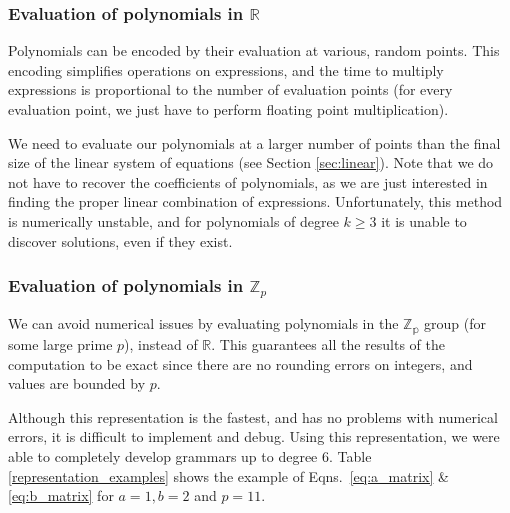\subsubsection{Evaluation of polynomials in $\mathbb{R}$}
Polynomials can be encoded by their evaluation at various, random points.
This encoding simplifies operations on expressions, and the time to multiply expressions
is proportional to the number of evaluation points (for every evaluation
point, we just have to perform floating point multiplication).

We need to evaluate our polynomials at a larger number of points than
the final size of the linear system of equations (see Section
\ref{sec:linear}). Note that we do not have to recover the
coefficients of polynomials, as we are just interested in finding the
proper linear combination of expressions.  Unfortunately, this method
is numerically unstable, and for polynomials of degree $k \geq 3$ it
is unable to discover solutions, even if they exist.

\subsubsection{Evaluation of polynomials in $\mathbb{Z}_p$}
We can avoid numerical issues by evaluating polynomials in the
$\mathbb{Z_p}$ group (for some large prime $p$), instead of
$\mathbb{R}$. This guarantees all the results of the computation
to be exact since there are no rounding errors on integers, and values are
bounded by $p$.

Although this representation is the fastest, and has no problems with
numerical errors, it is difficult to implement and debug. Using this
representation, we were able to completely develop grammars up to 
degree $6$. Table \ref{representation_examples} shows the example
of Eqns.~\ref{eq:a_matrix} \& \ref{eq:b_matrix} for $a = 1, b = 2$ and $p = 11$.

